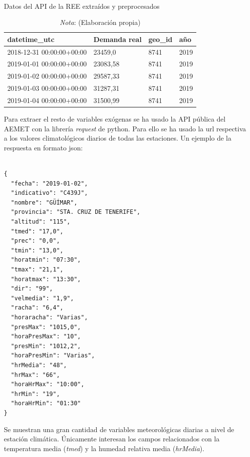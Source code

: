 \documentclass[12pt,a4paper]{report}
\begin{document}
\begin{table}[H]
\centering
\caption{\\ Datos del API de la REE extraídos y preprocesados} 
\renewcommand{\arraystretch}{1.3} %
\begin{tabular}{llll}
\toprule
\textbf{datetime\_utc}       & \textbf{Demanda real} & \textbf{geo\_id} & \textbf{año} \\ \midrule
2018-12-31 00:00:00+00:00    & 23459,0               & 8741             & 2019         \\ \hline
2019-01-01 00:00:00+00:00    & 23083,58              & 8741             & 2019         \\ \hline
2019-01-02 00:00:00+00:00    & 29587,33              & 8741             & 2019         \\ \hline
2019-01-03 00:00:00+00:00    & 31287,31              & 8741             & 2019         \\ \hline
2019-01-04 00:00:00+00:00    & 31500,99              & 8741             & 2019         \\ \bottomrule
\end{tabular}
\renewcommand{\arraystretch}{1} %

\label{tbl:datos_demanda}
\caption*{\textit{Nota}: (Elaboración propia)}
\end{table}


Para extraer el resto de variables exógenas se ha usado la API pública del AEMET con la librería \textit{request} de python. Para ello se ha usado la url respectiva a los valores climatológicos diarios de todas las estaciones. Un ejemplo de la respuesta en formato json:


\begin{verbatim}

{
  "fecha": "2019-01-02",
  "indicativo": "C439J",
  "nombre": "GÜÍMAR",
  "provincia": "STA. CRUZ DE TENERIFE",
  "altitud": "115",
  "tmed": "17,0",
  "prec": "0,0",
  "tmin": "13,0",
  "horatmin": "07:30",
  "tmax": "21,1",
  "horatmax": "13:30",
  "dir": "99",
  "velmedia": "1,9",
  "racha": "6,4",
  "horaracha": "Varias",
  "presMax": "1015,0",
  "horaPresMax": "10",
  "presMin": "1012,2",
  "horaPresMin": "Varias",
  "hrMedia": "48",
  "hrMax": "66",
  "horaHrMax": "10:00",
  "hrMin": "19",
  "horaHrMin": "01:30"
}
\end{verbatim}

Se muestran una gran cantidad de variables meteorológicas diarias a nivel de estación climática. Únicamente interesan los campos relacionados con la temperatura media (\textit{tmed}) y la humedad relativa media (\textit{hrMedia}).
\end{document}
